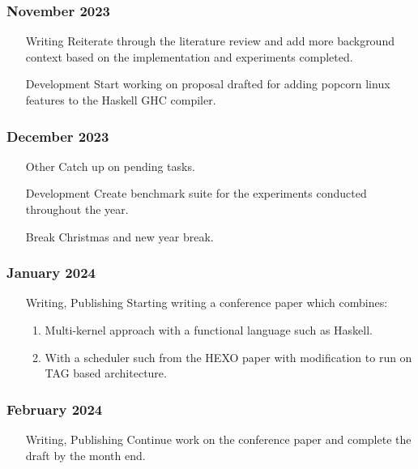  \subsubsection{November 2023}
  \begin{enumerate}
    \item [Writing] Reiterate through the literature review and add more background context based on the implementation and experiments 
    completed.
    \item [Development] Start working on proposal drafted for adding popcorn linux features to the Haskell GHC compiler.
 \end{enumerate}

 \subsubsection{December 2023}
  \begin{enumerate}
    \item [Other] Catch up on pending tasks.
    \item [Development] Create benchmark suite for the experiments conducted throughout the year.
    \item [Break] Christmas and new year break.
 \end{enumerate}

 \subsubsection{January 2024}
  \begin{enumerate}
    \item [Writing, Publishing] Starting writing a conference paper which combines:
    \begin{enumerate}
        \item Multi-kernel approach with a functional language such as Haskell.
        \item With a scheduler such from the HEXO paper with modification to run on TAG based architecture. 
      \end{enumerate}
 \end{enumerate}

 \subsubsection{February 2024}
  \begin{enumerate}
    \item [Writing, Publishing] Continue work on the conference paper and complete the draft by the month end.
 \end{enumerate}

